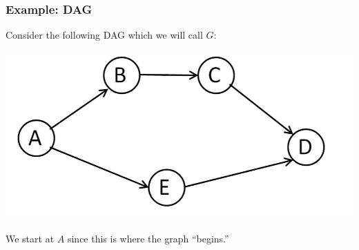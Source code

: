 \documentclass[letterpaper]{article}
\begin{document}
\subsubsection{Example: DAG}
Consider the following DAG which we will call $G$:
\begin{center}
    \includegraphics[scale=0.4]{assets/dag_ex.png}
\end{center}
We start at $A$ since this is where the graph ``begins.''
\end{document}
